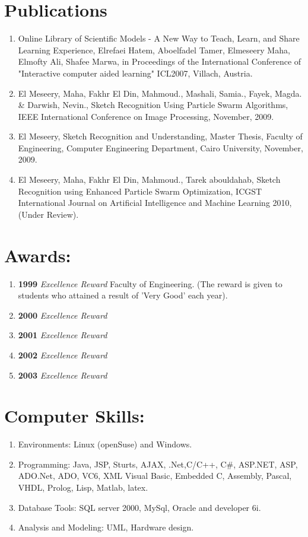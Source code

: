 \documentclass{article}
\begin{document}
 \section*{Publications}
 \begin{enumerate}
  \item Online Library of Scientific Models - A New Way to Teach, Learn, and
Share Learning Experience, Elrefaei Hatem, Aboelfadel Tamer, Elmeseery Maha,
Elmofty Ali, Shafee Marwa, in Proceedings of the International Conference of "Interactive computer aided learning" ICL2007, Villach, Austria.\textbf{\underbar{}}
  \item El Meseery, Maha, Fakhr El Din, Mahmoud., Mashali, Samia., Fayek, Magda.
 \& Darwish, Nevin., Sketch Recognition Using Particle Swarm Algorithms,  IEEE International Conference on Image Processing, November,  2009.
  \item El Meseery, Sketch Recognition and Understanding,  Master Thesis,
  Faculty of Engineering, Computer Engineering Department, Cairo University,
  November, 2009.
  \item El Meseery, Maha, Fakhr El Din, Mahmoud., Tarek abouldahab, Sketch
  Recognition using Enhanced Particle Swarm Optimization, ICGST International Journal on Artificial Intelligence and Machine Learning  2010, (Under Review).
\end{enumerate}
 \section*{Awards:}
  \begin{enumerate}
    \item \textbf{1999} \textit{Excellence Reward} Faculty of Engineering.
    (The reward is given to students who attained a result of 'Very Good' each year).
    \item \textbf{2000} \textit{Excellence Reward}
    \item \textbf{2001} \textit{Excellence Reward}
    \item \textbf{2002} \textit{Excellence Reward}
    \item \textbf{2003} \textit{Excellence Reward}
  \end{enumerate}
 \section*{Computer Skills:}
 \begin{enumerate}
\item Environments: Linux (openSuse) and Windows.
 \item Programming: Java, JSP, Sturts, AJAX, .Net,C/C++, C\#,  ASP.NET, ASP, ADO.Net, ADO, VC6,  XML  Visual Basic, Embedded C, Assembly, Pascal, VHDL, Prolog, Lisp, Matlab, latex.
 \item Database Tools: SQL server 2000, MySql, Oracle and developer 6i.
 \item Analysis and Modeling: UML, Hardware design.
\end{enumerate}
\end{document}
